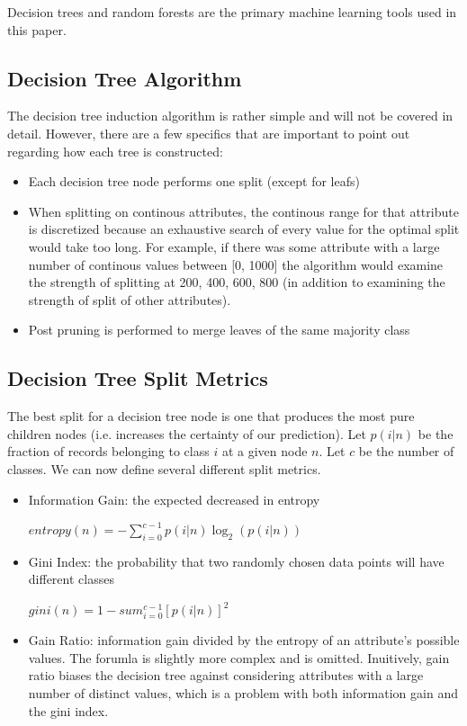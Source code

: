 \documentclass{article} %
\begin{document}
Decision trees and random forests are the primary machine learning tools used in this paper. 

\subsection {Decision Tree Algorithm}

The decision tree induction algorithm is rather simple and will not be covered in detail. However, there are a few specifics that are important to point out regarding how each tree is constructed: 

\begin{itemize}
\item 
Each decision tree node performs one split (except for leafs)
\item
When splitting on continous attributes, the continous range for that attribute is discretized because an exhaustive search of every value for the optimal split would take too long. For example, if there was some attribute with a large number of continous values between [0, 1000] the algorithm would examine the strength of splitting at 200, 400, 600, 800 (in addition to examining the strength of split of other attributes). 
\item
Post pruning is performed to merge leaves of the same majority class

\end{itemize}

\subsection{Decision Tree Split Metrics}

The best split for a decision tree node is one that produces the most pure children nodes (i.e. increases the certainty of our prediction). Let \(p(i | n)\) be the fraction of records belonging to class \(i\) at a given node \(n\). Let \(c\) be the number of classes. We can now define several different split metrics.

\begin{itemize}
\item
Information Gain: the expected decreased in entropy

 \(entropy(n) = -\sum_{i=0}^{c-1} p(i|n)\log _2 \left( p(i|n) \right)\)
\item
Gini Index: the probability that two randomly chosen data points will have different classes

 \(gini(n)=1-sum_{i=0}^{c-1} [p(i|n)]^2 \)
\item
Gain Ratio: information gain divided by the entropy of an attribute's possible values. The forumla is slightly more complex and is omitted. Inuitively, gain ratio biases the decision tree against considering attributes with a large number of distinct values, which is a problem with both information gain and the gini index. 

\end{itemize}
\end{document}
